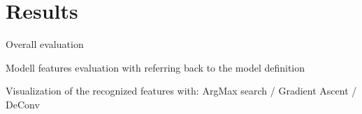 \chapter{Results}

Overall evaluation

Modell features evaluation with referring back to the model definition

Visualization of the recognized features with:
ArgMax search / Gradient Ascent / DeConv
